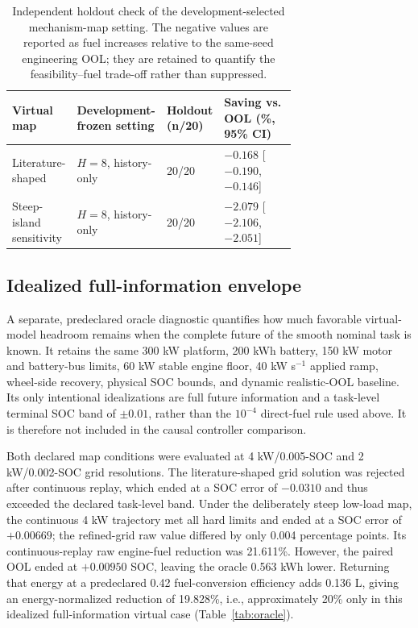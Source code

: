 \documentclass[agriengineering,article,submit,moreauthors]{Definitions/mdpi}
\begin{document}
\begin{table}[H]
\centering
\caption{Independent holdout check of the development-selected mechanism-map setting. The negative values are reported as fuel increases relative to the same-seed engineering OOL; they are retained to quantify the feasibility--fuel trade-off rather than suppressed.}
\label{tab:mechanism-holdout}
\scriptsize
\setlength{\tabcolsep}{3pt}
\begin{tabularx}{\linewidth}{@{}X p{0.27\linewidth} p{0.13\linewidth} p{0.30\linewidth}@{}}
\toprule
Virtual map & Development-frozen setting & Holdout (n/20) & Saving vs. OOL (\%, 95\% CI) \\
\midrule
Literature-shaped & $H=8$, history-only & 20/20 & $-0.168$ [$-0.190$, $-0.146$] \\
Steep-island sensitivity & $H=8$, history-only & 20/20 & $-2.079$ [$-2.106$, $-2.051$] \\
\bottomrule
\end{tabularx}
\end{table}

\subsection{Idealized full-information envelope}
A separate, predeclared oracle diagnostic quantifies how much favorable virtual-model headroom remains when the complete future of the smooth nominal task is known. It retains the same 300 kW platform, 200 kWh battery, 150 kW motor and battery-bus limits, 60 kW stable engine floor, 40 kW s$^{-1}$ applied ramp, wheel-side recovery, physical SOC bounds, and dynamic realistic-OOL baseline. Its only intentional idealizations are full future information and a task-level terminal SOC band of $\pm0.01$, rather than the $10^{-4}$ direct-fuel rule used above. It is therefore not included in the causal controller comparison.

Both declared map conditions were evaluated at 4 kW/0.005-SOC and 2 kW/0.002-SOC grid resolutions. The literature-shaped grid solution was rejected after continuous replay, which ended at a SOC error of $-0.0310$ and thus exceeded the declared task-level band. Under the deliberately steep low-load map, the continuous 4 kW trajectory met all hard limits and ended at a SOC error of $+0.00669$; the refined-grid raw value differed by only 0.004 percentage points. Its continuous-replay raw engine-fuel reduction was 21.611\%. However, the paired OOL ended at $+0.00950$ SOC, leaving the oracle 0.563 kWh lower. Returning that energy at a predeclared 0.42 fuel-conversion efficiency adds 0.136 L, giving an energy-normalized reduction of 19.828\%, i.e., approximately 20\% only in this idealized full-information virtual case (Table~\ref{tab:oracle}).
\end{document}
